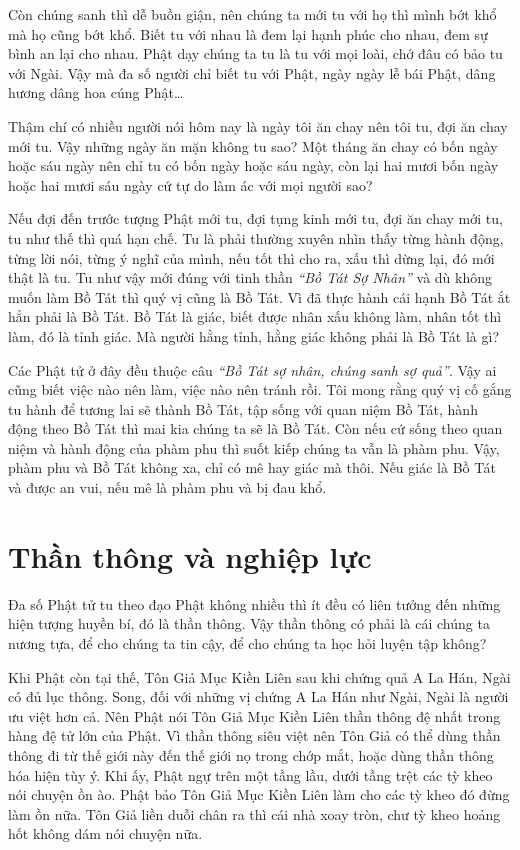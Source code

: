 \documentclass[
  12pt,
  oneside]{book}
\begin{document}
Còn chúng sanh thì dễ buồn giận, nên chúng ta mới tu với họ thì mình bớt khổ mà họ cũng bớt khổ. Biết tu với nhau là đem lại hạnh phúc cho nhau, đem sự bình an lại cho nhau. Phật dạy chúng ta tu là tu với mọi loài, chớ đâu có bảo tu với Ngài. Vậy mà đa số người chỉ biết tu với Phật, ngày ngày lễ bái Phật, dâng hương dâng hoa cúng Phật\ldots{}

Thậm chí có nhiều người nói hôm nay là ngày tôi ăn chay nên tôi tu, đợi ăn chay mới tu. Vậy những ngày ăn mặn không tu sao? Một tháng ăn chay có bốn ngày hoặc sáu ngày nên chỉ tu có bốn ngày hoặc sáu ngày, còn lại hai mươi bốn ngày hoặc hai mươi sáu ngày cứ tự do làm ác với mọi người sao?

Nếu đợi đến trước tượng Phật mới tu, đợi tụng kinh mới tu, đợi ăn chay mới tu, tu như thế thì quá hạn chế. Tu là phải thường xuyên nhìn thấy từng hành động, từng lời nói, từng ý nghĩ của mình, nếu tốt thì cho ra, xấu thì dừng lại, đó mới thật là tu. Tu như vậy mới đúng với tinh thần \emph{``Bồ Tát Sợ Nhân''} và dù không muốn làm Bồ Tát thì quý vị cũng là Bồ Tát. Vì đã thực hành cái hạnh Bồ Tát ắt hẳn phải là Bồ Tát. Bồ Tát là giác, biết được nhân xấu không làm, nhân tốt thì làm, đó là tỉnh giác. Mà người hằng tỉnh, hằng giác không phải là Bồ Tát là gì?

Các Phật tử ở đây đều thuộc câu \emph{``Bồ Tát sợ nhân, chúng sanh sợ quả''}. Vậy ai cũng biết việc nào nên làm, việc nào nên tránh rồi. Tôi mong rằng quý vị cố gắng tu hành để tương lai sẽ thành Bồ Tát, tập sống với quan niệm Bồ Tát, hành động theo Bồ Tát thì mai kia chúng ta sẽ là Bồ Tát. Còn nếu cứ sống theo quan niệm và hành động của phàm phu thì suốt kiếp chúng ta vẫn là phàm phu. Vậy, phàm phu và Bồ Tát không xa, chỉ có mê hay giác mà thôi. Nếu giác là Bồ Tát và được an vui, nếu mê là phàm phu và bị đau khổ.

\hypertarget{than-thong-va-nghiep-luc}{%
\chapter*{Thần thông và nghiệp lực}\label{than-thong-va-nghiep-luc}}

Đa số Phật tử tu theo đạo Phật không nhiều thì ít đều có liên tưởng đến những hiện tượng huyền bí, đó là thần thông. Vậy thần thông có phải là cái chúng ta nương tựa, để cho chúng ta tin cậy, để cho chúng ta học hỏi luyện tập không?

Khi Phật còn tại thế, Tôn Giả Mục Kiền Liên sau khi chứng quả A La Hán, Ngài có đủ lục thông. Song, đối với những vị chứng A La Hán như Ngài, Ngài là người ưu việt hơn cả. Nên Phật nói Tôn Giả Mục Kiền Liên thần thông đệ nhất trong hàng đệ tử lớn của Phật. Vì thần thông siêu việt nên Tôn Giả có thể dùng thần thông đi từ thế giới này đến thế giới nọ trong chớp mắt, hoặc dùng thần thông hóa hiện tùy ý. Khi ấy, Phật ngự trên một tầng lầu, dưới tầng trệt các tỳ kheo nói chuyện ồn ào. Phật bảo Tôn Giả Mục Kiền Liên làm cho các tỳ kheo đó đừng làm ồn nữa. Tôn Giả liền duỗi chân ra thì cái nhà xoay tròn, chư tỳ kheo hoảng hốt không dám nói chuyện nữa.
\end{document}
